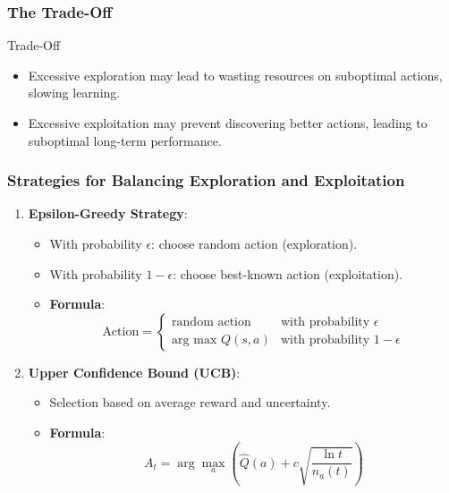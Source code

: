 \documentclass[aspectratio=169]{beamer}
\begin{document}
\begin{frame}[fragile]
    \frametitle{The Trade-Off}
    \begin{block}{Trade-Off}
        \begin{itemize}
            \item Excessive exploration may lead to wasting resources on suboptimal actions, slowing learning.
            \item Excessive exploitation may prevent discovering better actions, leading to suboptimal long-term performance.
        \end{itemize}
    \end{block}
\end{frame}

\begin{frame}[fragile]
    \frametitle{Strategies for Balancing Exploration and Exploitation}
    \begin{enumerate}
        \item \textbf{Epsilon-Greedy Strategy}:
        \begin{itemize}
            \item With probability \( \epsilon \): choose random action (exploration).
            \item With probability \( 1 - \epsilon \): choose best-known action (exploitation).
            \item \textbf{Formula}:
            \begin{equation}
            \text{Action} = 
            \begin{cases} 
            \text{random action} & \text{with probability } \epsilon \\
            \text{arg max } Q(s, a) & \text{with probability } 1 - \epsilon 
            \end{cases}
            \end{equation}
        \end{itemize}
        
        \item \textbf{Upper Confidence Bound (UCB)}:
        \begin{itemize}
            \item Selection based on average reward and uncertainty.
            \item \textbf{Formula}:
            \begin{equation}
            A_t = \arg \max_a \left( \hat{Q}(a) + c \sqrt{\frac{\ln t}{n_a(t)}} \right)
            \end{equation}
        \end{itemize}
    \end{enumerate}
\end{frame}
\end{document}
